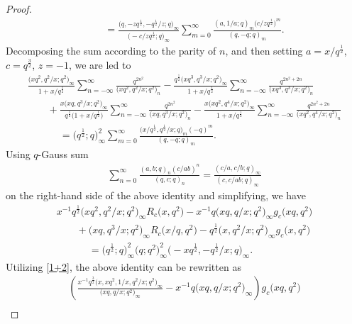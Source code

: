 \documentclass[10pt,a4paper]{amsart}
\numberwithin{equation}{section}
\begin{document}
\begin{proof}
\begin{gather*}
\qquad=\frac{\bigl(q,-zq^{\frac{1}{2}},-q^{\frac{1}{2}}/z;q\bigr)_{\infty}}{\bigl(-c/zq^{\frac{1}{2}};q\bigr)_{\infty}}
\sum_{m=0}^{\infty}\frac{(a,1/a;q)_m\bigl(c/zq^{\frac{1}{2}}\bigr)^m}{(q,-q;q)_m}.
\end{gather*}
Decomposing the sum according to the parity of $n$,
and then setting $a=x/q^{\frac{1}{2}}$, $c=q^{\frac{3}{2}}$, $z=-1$, we are led to
\begin{gather*}
\frac{\bigl(xq^2,q^2/x;q^2\bigr)_{\infty}}{1+x/q^{\frac{1}{2}}}\sum_{n=-\infty}^{\infty}
\frac{q^{2n^2}}{\bigl(xq^2,q^2/x;q^2\bigr)_n}-\frac{q^{\frac{1}{2}}\bigl(xq^3,q^3/x;q^2\bigr)_{\infty}}{1+x/q^{\frac{1}{2}}}\sum_{n=-\infty}^{\infty}
\frac{q^{2n^2+2n}}{\bigl(xq^3,q^3/x;q^2\bigr)_n}\\
\qquad+\frac{x\bigl(xq,q^3/x;q^2\bigr)_{\infty}}{q^{\frac{1}{2}}\bigl(1+x/q^{\frac{1}{2}}\bigr)}\sum_{n=-\infty}^{\infty}
\frac{q^{2n^2}}{\bigl(xq,q^3/x;q^2\bigr)_n}-\frac{x\bigl(xq^2,q^4/x;q^2\bigr)_{\infty}}{1+x/q^{\frac{1}{2}}}\sum_{n=-\infty}^{\infty}
\frac{q^{2n^2+2n}}{\bigl(xq^2,q^4/x;q^2\bigr)_n}\\
\phantom{\qquad+}{}=\bigl(q^{\frac{1}{2}};q\bigr)_{\infty}^2
\sum_{m=0}^{\infty}\frac{\bigl(x/q^{\frac{1}{2}},q^{\frac{1}{2}}/x;q\bigr)_m(-q)^m}{(q,-q;q)_m}.
\end{gather*}
Using $q$-Gauss sum \cite[Appendix (II.8)]{GR}
\begin{align*}
\sum_{n=0}^{\infty}\frac{(a,b;q)_n(c/ab)^n}{(q,c;q)_n}
=\frac{(c/a,c/b;q)_{\infty}}{(c,c/ab;q)_{\infty}}
\end{align*}
on the right-hand side of the above identity and simplifying, we have
\begin{gather*}%
x^{-1}q^{\frac{1}{2}}\bigl(xq^2,q^2/x;q^2\bigr)_{\infty}R_c\bigl(x,q^2\bigr)
-x^{-1}q\bigl(xq,q/x;q^2\bigr)_{\infty}g_c\bigl(xq,q^2\bigr) \\
\qquad+\bigl(xq,q^3/x;q^2\bigr)_{\infty}R_c\bigl(x/q,q^2\bigr)
-q^{\frac{1}{2}}\bigl(x,q^2/x;q^2\bigr)_{\infty}g_c\bigl(x,q^2\bigr) \\
\phantom{\qquad+}{}=\bigl(q^{\frac{1}{2}};q\bigr)_{\infty}^2\bigl(q;q^2\bigr)_{\infty}^2
\bigl(-xq^{\frac{1}{2}},-q^{\frac{1}{2}}/x;q\bigr)_{\infty}.
\end{gather*}
Utilizing \eqref{1+2}, the above identity can be rewritten as
\begin{gather}
\left(\frac{x^{-1}q^{\frac{3}{2}}\bigl(x,xq^2,1/x,q^2/x;q^2\bigr)_{\infty}}
{\bigl(xq,q/x;q^2\bigr)_{\infty}}
-x^{-1}q\bigl(xq,q/x;q^2\bigr)_{\infty}\right)g_c\bigl(xq,q^2\bigr)\nonumber\\

\end{gather}
\end{proof}
\end{document}
